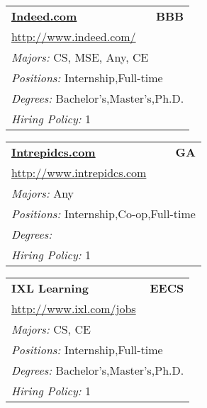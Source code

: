 \documentclass[twoside]{article}
\begin{document}
\begin{center}
\begin{multicols}{3}
\begin{FlushLeft}
\begin{minipage}{.9\columnwidth}
\end{minipage}
 
\begin{minipage}{.9\columnwidth}\begin{tabularx}{.95\columnwidth}{Xr}
                 {\Large\bf \url{Indeed.com}} & {\Large\bf BBB}\\
    \multicolumn{2}{p{.95\columnwidth}}{\url{http://www.indeed.com/}}\\
    \multicolumn{2}{p{.95\columnwidth}}{\emph{Majors:} CS, MSE, Any, CE}\\
    \multicolumn{2}{p{.95\columnwidth}}{\emph{Positions:} Internship,Full-time}\\
    \multicolumn{2}{p{.95\columnwidth}}{\emph{Degrees:} Bachelor's,Master's,Ph.D.}\\
    \multicolumn{2}{p{.95\columnwidth}}{\emph{Hiring Policy:} 1}\\
    \end{tabularx}
    
\end{minipage}
 
\begin{minipage}{.9\columnwidth}\begin{tabularx}{.95\columnwidth}{Xr}
                 {\Large\bf \url{Intrepidcs.com}} & {\Large\bf GA}\\
    \multicolumn{2}{p{.95\columnwidth}}{\url{http://www.intrepidcs.com}}\\
    \multicolumn{2}{p{.95\columnwidth}}{\emph{Majors:} Any}\\
    \multicolumn{2}{p{.95\columnwidth}}{\emph{Positions:} Internship,Co-op,Full-time}\\
    \multicolumn{2}{p{.95\columnwidth}}{\emph{Degrees:} }\\
    \multicolumn{2}{p{.95\columnwidth}}{\emph{Hiring Policy:} 1}\\
    \end{tabularx}
    
\end{minipage}
 
\begin{minipage}{.9\columnwidth}\begin{tabularx}{.95\columnwidth}{Xr}
                 {\Large\bf IXL Learning} & {\Large\bf EECS}\\
    \multicolumn{2}{p{.95\columnwidth}}{\url{http://www.ixl.com/jobs}}\\
    \multicolumn{2}{p{.95\columnwidth}}{\emph{Majors:} CS, CE}\\
    \multicolumn{2}{p{.95\columnwidth}}{\emph{Positions:} Internship,Full-time}\\
    \multicolumn{2}{p{.95\columnwidth}}{\emph{Degrees:} Bachelor's,Master's,Ph.D.}\\
    \multicolumn{2}{p{.95\columnwidth}}{\emph{Hiring Policy:} 1}\\
    \end{tabularx}
    

\end{minipage}
\end{FlushLeft}
\end{multicols}
\end{center}
\end{document}
